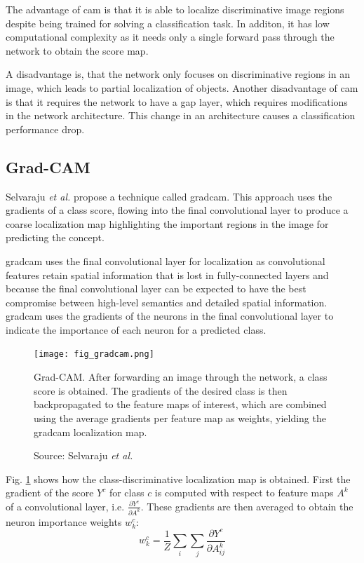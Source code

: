 The advantage of \acrlong{cam} is that it is able to localize discriminative image regions despite being trained for solving a classification task. In additon, it has low computational complexity as it needs only a single forward pass through the network to obtain the score map.

A disadvantage is, that the network only focuses on discriminative regions in an image, which leads to partial localization of objects. Another disadvantage of \acrshort{cam} is that it requires the network to have a \acrshort{gap} layer, which requires modifications in the network architecture. This change in an architecture causes a classification performance drop.

\subsection{Grad-CAM}
Selvaraju \textit{et al.} \cite{selvaraju2017grad} propose a technique called \acrfull{gradcam}. This approach uses the gradients of a class score, flowing into 
the final convolutional layer to produce a coarse localization map highlighting the important regions in the image for predicting the concept. 

\acrshort{gradcam} uses the final convolutional layer for localization as convolutional features retain spatial information that is lost in fully-connected layers and because the final convolutional layer can be expected to have the best compromise between high-level semantics and detailed spatial information. \acrshort{gradcam} uses the gradients of the neurons in the final convolutional layer to indicate the importance of each neuron for a predicted class.

\begin{figure}[ht]
    \begin{center}       
    \texttt{[image: fig\_gradcam.png]}
    \caption[Grad-CAM]{Grad-CAM. After forwarding an image through the network, a class score is obtained. The gradients of the desired class is then backpropagated to the feature maps of interest, which are combined using the average gradients per feature map as weights, yielding the \acrshort{gradcam} localization map.}
    \caption*{Source: Selvaraju \textit{et al.} \cite{selvaraju2017grad}}
    \label{fig:gradcam}
    \end{center}
\end{figure}
Fig. \ref{fig:gradcam} shows how the class-discriminative localization map is obtained. First the gradient of the score $Y^c$ for class $c$ is computed with respect to feature maps $A^k$ of a convolutional layer, i.e. $\frac{\partial{Y^c}}{\partial{A^k}}$. These gradients are then averaged to obtain the neuron importance weights $w_{k}^{c}$:
\begin{equation}
    w_{k}^{c} = \frac{1}{Z}\sum_{i}\sum_{j}\frac{\partial{Y^c}}{\partial{A_{ij}^{k}}}
\end{equation}

